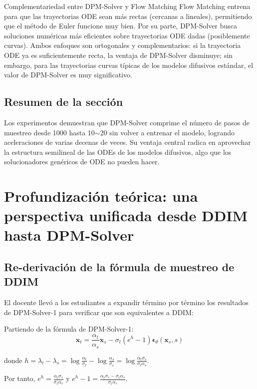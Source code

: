 \documentclass[a4paper]{article}
\begin{document}
\begin{knowledgebox}{Complementariedad entre DPM-Solver y Flow Matching}
Flow Matching entrena para que las trayectorias ODE sean más rectas (cercanas a lineales), permitiendo que el método de Euler funcione muy bien. Por su parte, DPM-Solver busca soluciones numéricas más eficientes sobre trayectorias ODE dadas (posiblemente curvas). Ambos enfoques son ortogonales y complementarios: si la trayectoria ODE ya es suficientemente recta, la ventaja de DPM-Solver disminuye; sin embargo, para las trayectorias curvas típicas de los modelos difusivos estándar, el valor de DPM-Solver es muy significativo.
\end{knowledgebox}

\subsection{Resumen de la sección}

Los experimentos demuestran que DPM-Solver comprime el número de pasos de muestreo desde 1000 hasta 10$\sim$20 sin volver a entrenar el modelo, logrando aceleraciones de varias decenas de veces. Su ventaja central radica en aprovechar la estructura semilineal de las ODEs de los modelos difusivos, algo que los solucionadores genéricos de ODE no pueden hacer.

\section{Profundización teórica: una perspectiva unificada desde DDIM hasta DPM-Solver}

\subsection{Re-derivación de la fórmula de muestreo de DDIM}

El docente llevó a los estudiantes a expandir término por término los resultados de DPM-Solver-1 para verificar que son equivalentes a DDIM:

Partiendo de la fórmula de DPM-Solver-1:
$$\mathbf{x}_t = \frac{\alpha_t}{\alpha_s} \mathbf{x}_s - \sigma_t (e^{h} - 1) \boldsymbol{\epsilon}_\theta(\mathbf{x}_s, s)$$

donde $h = \lambda_t - \lambda_s = \log\frac{\alpha_t}{\sigma_t} - \log\frac{\alpha_s}{\sigma_s} = \log\frac{\alpha_t \sigma_s}{\sigma_t \alpha_s}$.

Por tanto, $e^h = \frac{\alpha_t \sigma_s}{\sigma_t \alpha_s}$ y $e^h - 1 = \frac{\alpha_t \sigma_s - \sigma_t \alpha_s}{\sigma_t \alpha_s}$.
\end{document}
